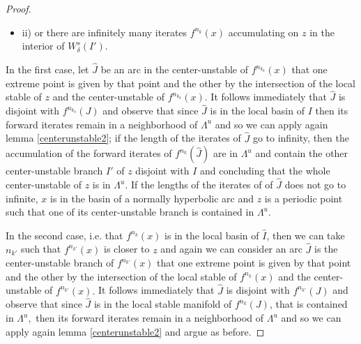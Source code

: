 \documentclass[a4paper,11pt]{article}
\theoremstyle{definition}
\def\La{\Lambda}
\def\de{\delta}
\def\La{\Lambda}
\begin{document}
\begin{proof}
\begin{itemize}
    \item[--] ii) or there are infinitely many iterates  $f^{n_k}(x)$ accumulating on $z$ in the interior of $W^s_\de(I').$
\end{itemize}

  In the first case, let $\hat J$ be an arc in the center-unstable of $f^{n_{k_0}}(x)$ that one extreme point is given by that point and the other by the intersection of the local stable of $z$ and the center-unstable of $f^{n_{k_0}}(x).$ It follows immediately that $\hat J$ is disjoint with $f^{n_{k_0}}(J)$ and observe that since $\hat J$ is in the local basin of $I$ then its forward iterates remain in a neighborhood of $\La^u$ and so  we can apply again lemma \ref{centerunstable2}; if the length of the iterates of $\hat J$ go to infinity, then the accumulation of the  forward iterates of $f^{n_k}(\hat J)$ are in $\La^u$ and  contain the other center-unstable branch $I'$ of $z$ disjoint with $I$ and concluding that the whole center-unstable of $z$ is in $\La^u.$ If the lengths of the iterates of of $\hat J$ does not go to infinite,  $x$ is in the basin of a normally hyperbolic arc and $z$ is a periodic point such that one of its center-unstable branch is contained in $\La^u.$  
  
  In the second case, i.e. that $f^{n_k}(x)$ is in the local basin of $\hat I$, then we can take $n_{k'}$ such that $f^{n_{k'}}(x)$ is closer to $z$ and again we can consider an arc $\hat J$ is the center-unstable branch of $f^{n_{k'}}(x)$ that one extreme point is given by that point and the other by the intersection of the local stable of $f^{n_k}(x)$ and the center-unstable of $f^{n_{k'}}(x).$ It follows immediately that $\hat J$ is disjoint with $f^{n_{k'}}(J)$ and observe that since $\hat J$ is in the local stable manifold of  $f^{n_k}(J)$, that is contained in $\La^u,$ then its forward iterates remain in a neighborhood of $\La^u$ and so  we can apply again lemma \ref{centerunstable2} and argue as before.











\end{proof}
\end{document}
